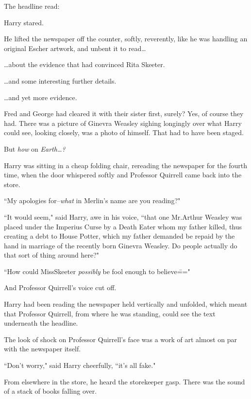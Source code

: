 The headline read:


Harry stared.

He lifted the newspaper off the counter, softly, reverently, like he was handling an original Escher artwork, and unbent it to read{\ldots}

{\ldots}about the evidence that had convinced Rita Skeeter.

{\ldots}and some interesting further details.

{\ldots}and yet more evidence.

Fred and George had cleared it with their sister first, surely? Yes, of course they had. There was a picture of Ginevra Weasley sighing longingly over what Harry could see, looking closely, was a photo of himself. That had to have been staged.

But \emph{how} on \emph{Earth{\ldots}?}

Harry was sitting in a cheap folding chair, rereading the newspaper for the fourth time, when the door whispered softly and Professor Quirrell came back into the store.

``My apologies for\---\emph{what} in Merlin's name are you reading?"

``It would seem," said Harry, awe in his voice, ``that one Mr.\?Arthur Weasley was placed under the Imperius Curse by a Death Eater whom my father killed, thus creating a debt to House Potter, which my father demanded be repaid by the hand in marriage of the recently born Ginevra Weasley. Do people actually do that sort of thing around here?"

``How could Miss\?Skeeter \emph{possibly} be fool enough to believe\==="

And Professor Quirrell's voice cut off.

Harry had been reading the newspaper held vertically and unfolded, which meant that Professor Quirrell, from where he was standing, could see the text underneath the headline.

The look of shock on Professor Quirrell's face was a work of art almost on par with the newspaper itself.

``Don't worry," said Harry cheerfully, ``it's all fake."

From elsewhere in the store, he heard the storekeeper gasp. There was the sound of a stack of books falling over.

